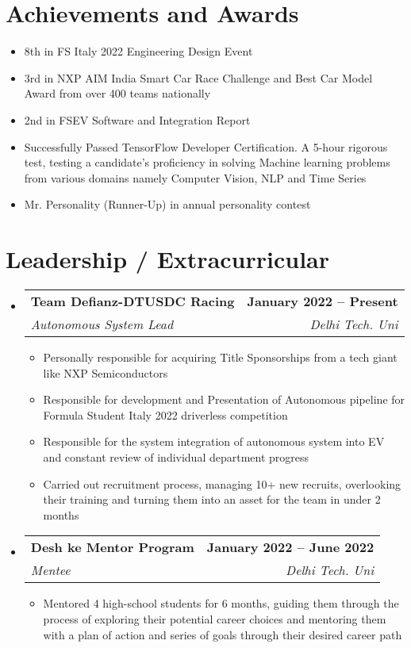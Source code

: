 \documentclass[letterpaper,11pt]{article}
\makeatletter
\newcommand{\resumeItem}[1]{
  \item\small{
    {#1 \vspace{-2pt}}
  }
}
\newcommand{\resumeSubheading}[4]{
  \vspace{-2pt}\item
    \begin{tabular*}{1.0\textwidth}[t]{l@{\extracolsep{\fill}}r}
      \textbf{#1} & \textbf{\small #2} \\
      \textit{\small#3} & \textit{\small #4} \\
    \end{tabular*}\vspace{-7pt}
}
\newcommand{\resumeSubHeadingListStart}{\begin{itemize}[leftmargin=0.0in, label={}]}
\newcommand{\resumeSubHeadingListEnd}{\end{itemize}}
\newcommand{\resumeItemListStart}{\begin{itemize}}
\newcommand{\resumeItemListEnd}{\end{itemize}\vspace{-5pt}}
\makeatother
\begin{document}
\section{Achievements and Awards}
    \resumeItemListStart
       \resumeItem{8th in FS Italy 2022 Engineering Design Event}
       \resumeItem{3rd in NXP AIM India Smart Car Race Challenge and Best Car Model Award from over 400 teams nationally}
       \resumeItem{2nd in FSEV Software and Integration Report}
       \resumeItem{Successfully Passed TensorFlow Developer Certification. A 5-hour rigorous test, testing a candidate’s proficiency in solving Machine learning problems from various domains namely Computer Vision, NLP and Time Series}
       \resumeItem{Mr. Personality (Runner-Up) in annual personality contest}
    \resumeItemListEnd

\section{Leadership / Extracurricular}
    \resumeSubHeadingListStart
        \resumeSubheading{Team Defianz-DTUSDC Racing}{January 2022 -- Present}{Autonomous System Lead}{Delhi Tech. Uni}
            \resumeItemListStart
                \resumeItem{Personally responsible for acquiring Title Sponsorships from a tech giant like NXP Semiconductors}
                \resumeItem{Responsible for development and Presentation of Autonomous pipeline for Formula Student Italy 2022 driverless competition}
                \resumeItem{Responsible for the system integration of autonomous system into EV and constant review of individual department progress}
                \resumeItem{Carried out recruitment process, managing 10+ new recruits, overlooking their training and turning them into an asset for the team in under 2 months}
            \resumeItemListEnd


        \resumeSubheading{Desh ke Mentor Program}{January 2022 -- June 2022}{Mentee}{Delhi Tech. Uni}
            \resumeItemListStart
                \resumeItem{Mentored 4 high-school students for 6 months, guiding them through the process of exploring their potential career choices and mentoring them with a plan of action and series of goals through their desired career path}
            \resumeItemListEnd
        
    \resumeSubHeadingListEnd

%
\end{document}
